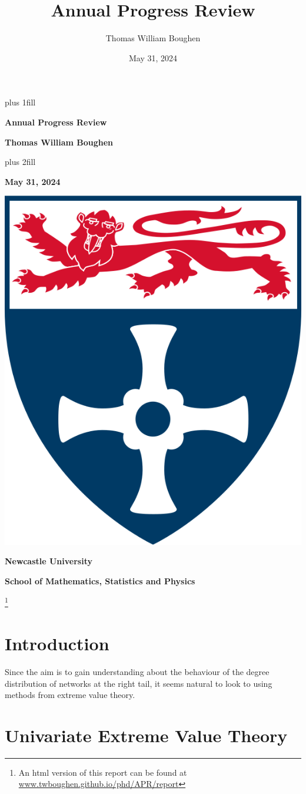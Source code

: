 \documentclass[
  10pt,
  a4paper,
]{scrreprt}
\title{Annual Progress Review}
\author{Thomas William Boughen}
\date{May 31, 2024}
\renewcommand*\contentsname{Table of contents}
\newcommand\contentsname{Table of contents}
\theoremstyle{definition}
\theoremstyle{plain}
\theoremstyle{plain}
\theoremstyle{plain}
\theoremstyle{remark}
\begin{document}
\cleardoublepage
\thispagestyle{empty}
{\centering
\hbox{}\vskip 0cm plus 1fill
{\Huge\bfseries Annual Progress Review \par}
\vspace{12ex}
{\Large\bfseries Thomas William Boughen \par}
\vspace{3ex}
\vskip 0cm plus 2fill
\vspace{3ex}
{\bfseries\large May 31, 2024 \par}
\vspace{12ex}
{\includegraphics[width=0.1\linewidth]{"imgs/University_of_Newcastle_Coat_of_Arms.png"}\par}
%
%
{\bfseries\large Newcastle University \par}
\vspace{3ex}
%
{\bfseries\large School of Mathematics, Statistics and Physics \par}
%
\vspace{12ex}
\footnote{An html version of this report can be found at \url{www.twboughen.github.io/phd/APR/report}}
\justifying
\noindent\ifdefined\Shaded\renewenvironment{Shaded}{\begin{tcolorbox}[borderline west={3pt}{0pt}{shadecolor}, interior hidden, sharp corners, boxrule=0pt, breakable, enhanced, frame hidden]}{\end{tcolorbox}}\fi

\renewcommand*\contentsname{Table of contents}
{
\hypersetup{linkcolor=}
\setcounter{tocdepth}{1}
\tableofcontents
}
\hypertarget{sec-int}{%
\chapter{Introduction}\label{sec-int}}

Since the aim is to gain understanding about the behaviour of the degree
distribution of networks at the right tail, it seems natural to look to
using methods from extreme value theory.

\hypertarget{sec-ext}{%
\chapter{Univariate Extreme Value Theory}\label{sec-ext}}

}
\end{document}
